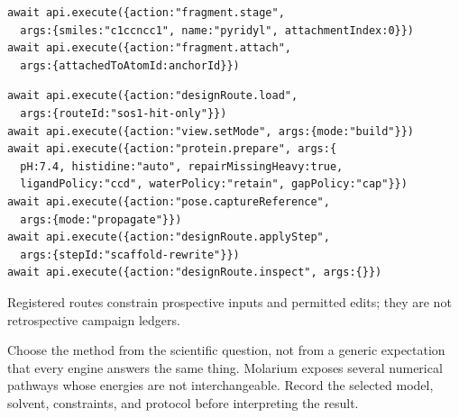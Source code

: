 \begin{lstlisting}
await api.execute({action:"fragment.stage",
  args:{smiles:"c1ccncc1", name:"pyridyl", attachmentIndex:0}})
await api.execute({action:"fragment.attach",
  args:{attachedToAtomId:anchorId}})
\end{lstlisting}

\begin{lstlisting}
await api.execute({action:"designRoute.load",
  args:{routeId:"sos1-hit-only"}})
await api.execute({action:"view.setMode", args:{mode:"build"}})
await api.execute({action:"protein.prepare", args:{
  pH:7.4, histidine:"auto", repairMissingHeavy:true,
  ligandPolicy:"ccd", waterPolicy:"retain", gapPolicy:"cap"}})
await api.execute({action:"pose.captureReference",
  args:{mode:"propagate"}})
await api.execute({action:"designRoute.applyStep",
  args:{stepId:"scaffold-rewrite"}})
await api.execute({action:"designRoute.inspect", args:{}})
\end{lstlisting}

Registered routes constrain prospective inputs and permitted edits; they are not retrospective campaign ledgers.


Choose the method from the scientific question, not from a generic expectation that every engine answers the same thing. Molarium exposes several numerical pathways whose energies are not interchangeable. Record the selected model, solvent, constraints, and protocol before interpreting the result.

